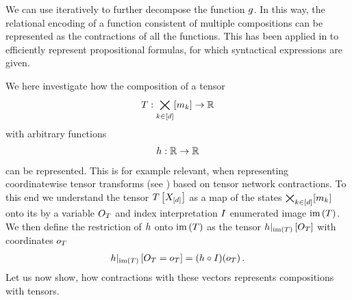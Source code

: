 We can use  iteratively to further decompose the function $g$.
In this way, the relational encoding of a function consistent of multiple compositions can be represented as the contractions of all the functions.
This has been applied in  to efficiently represent propositional formulas, for which syntactical expressions are given.


We here investigate how the composition of a tensor
\begin{align*}
	T : \bigtimes_{k\in[d]}[m_{k}] \rightarrow \mathbb{R}
\end{align*}
with arbitrary functions
\begin{align*}
	h: \mathbb{R} \rightarrow \mathbb{R}
\end{align*}
can be represented.
This is for example relevant, when representing coordinatewise tensor transforms (see ) based on tensor network contractions.
To this end we understand the tensor $T\left[X_{[d]}\right]$ as a map of the states $\bigtimes_{k\in[d]}[m_{k}]$ onto its by a variable $O_{T}$ and index interpretation $I$ enumerated image $\mathrm{im}\left(T\right)$.
We then define the restriction of $h$ onto $\mathrm{im}\left(T\right)$ as the tensor ${h}|_{\mathrm{im}\left(T\right)}\left[O_{T}\right]$ with coordinates $o_{T}$
\begin{align*}
	{h}|_{\mathrm{im}\left(T\right)}\left[O_{T}=o_{T}\right]
	= ({h}\circ{I})(o_{T}) \, .
\end{align*}
Let us now show, how contractions with these vectors represents compositions with tensors.

